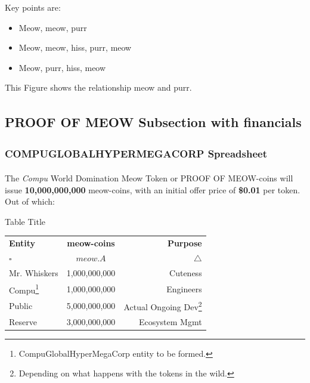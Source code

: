 \documentclass[9pt,oneside]{amsart}
\newenvironment{Figure}
  {\par\medskip\noindent\minipage{\linewidth}}
  {\endminipage\par\medskip}
\newcommand*\compu{COMPU\textsuperscript{\texttrademark}GLOBAL\textsuperscript{\texttrademark}HYPER\textsuperscript{\texttrademark}MEGA\textsuperscript{\texttrademark}CORP\textsuperscript{\texttrademark}}
\newcommand*\proofmeow{PROOF OF MEOW\textsuperscript{\textregistered}}
\begin{document}
\begin{multicols}{2}
Key points are:

\begin{itemize}
    \item Meow, meow, purr
    \item Meow, meow, hiss, purr, meow
    \item Meow, purr, hiss, meow
\end{itemize}


 This Figure shows the relationship meow and purr. 


\begin{Figure}
    \medskip
    \centering
    \medskip
\end{Figure}

\subsection{\proofmeow{} Subsection with financials}\label{subsec:financials_3}


\subsubsection{\compu{} Spreadsheet}\label{subsec:spreadsheet}

The \textit{Compu} World Domination Meow Token or \proofmeow{}-coins will issue \textbf{10,000,000,000} meow-coins, with an initial offer price of \textbf{\$0.01} per token.  Out of which:
\\
\begin{center} \label{tab:table1}
\caption{Table Title}
\begin{tabular}{l|c|r} %
    \textbf{Entity} & \textbf{meow-coins} & \textbf{Purpose}\\
        $ \square $ & $ meow.A $ & $ \bigtriangleup $ \\
        \hline
        Mr. Whiskers & 1,000,000,000 & Cuteness \\
        Compu\footnote{CompuGlobalHyperMegaCorp entity to be formed.} & 1,000,000,000 & Engineers \\
        Public & 5,000,000,000 & Actual Ongoing Dev\footnote{Depending on what happens with the tokens in the wild.} \\
        Reserve & 3,000,000,000 & Ecosystem Mgmt \\
        \bottomrule[1.25pt]
    \end{tabular}
\end{center}


\end{multicols}
\end{document}
